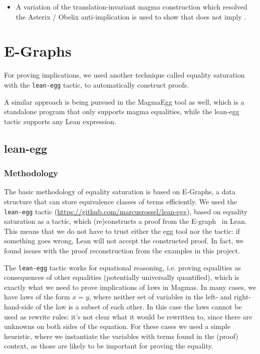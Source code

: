 \begin{itemize}
  \item A variation of the translation-invariant magma construction which resolved the Asterix / Obelix anti-implication is used to show that  does not imply .
\end{itemize}


\chapter{E-Graphs}\label{egraphs-chapter}

For proving implications, we used another technique called equality saturation~\cite{DBLP:journals/pacmpl/WillseyNWFTP21} with the \texttt{lean-egg} tactic, to automatically construct proofs.

A similar approach is being pursued in the MagmaEgg tool as well, which is a standalone program that only supports magma equalities, while the lean-egg tactic supports any Lean expression.

\section{lean-egg}

\subsection{Methodology}

The basic methodology of equality saturation is based on E-Graphs, a data structure that can store equivalence classes of terms efficiently.
We used the \texttt{lean-egg} tactic (\url{https://github.com/marcusrossel/lean-egg}), based on equality saturation as a tactic, which (re)constructs a proof from the E-graph~\cite{DBLP:journals/pacmpl/KoehlerGBGTS24} in Lean.
This means that we do not have to trust either the egg tool nor the tactic: if something goes wrong, Lean will not accept the constructed proof. In fact, we found issues with the proof reconstruction from the examples in this project.

The \texttt{lean-egg} tactic works for equational reasoning, i.e. proving equalities as consequences of other equalities (potentially universally quantified), which is exactly what we need to prove implications of laws in Magmas.
In many cases, we have laws of the form $x = y$, where neither set of variables in the left- and right-hand-side of the law is a subset of each other.
In this case the laws cannot be used as rewrite rules: it's not clear what it would be rewritten to, since there are unknowns on both sides of the equation.
For these cases we used a simple heuristic, where we instantiate the variables with terms found in the (proof) context, as those are likely to be important for proving the equality.

